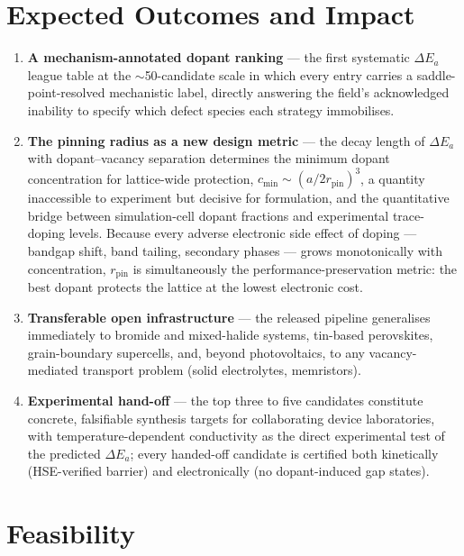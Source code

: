 \documentclass[11pt,a4paper]{article}
\begin{document}
\section{Expected Outcomes and Impact}

\begin{enumerate}[leftmargin=1.6em]
\item \textbf{A mechanism-annotated dopant ranking} --- the first systematic
$\Delta E_a$ league table at the $\sim$50-candidate scale in which every entry carries
a saddle-point-resolved mechanistic label, directly answering the field's acknowledged
inability to specify which defect species each strategy immobilises.

\item \textbf{The pinning radius as a new design metric} --- the decay length of
$\Delta E_a$ with dopant--vacancy separation determines the minimum dopant
concentration for lattice-wide protection,
$c_{\min}\sim (a/2r_{\mathrm{pin}})^{3}$, a quantity inaccessible to experiment but
decisive for formulation, and the quantitative bridge between simulation-cell dopant
fractions and experimental trace-doping levels. Because every adverse electronic side
effect of doping --- bandgap shift, band tailing, secondary phases --- grows
monotonically with concentration, $r_{\mathrm{pin}}$ is simultaneously the
performance-preservation metric: the best dopant protects the lattice at the lowest
electronic cost.

\item \textbf{Transferable open infrastructure} --- the released pipeline generalises
immediately to bromide and mixed-halide systems, tin-based perovskites, grain-boundary
supercells, and, beyond photovoltaics, to any vacancy-mediated transport problem
(solid electrolytes, memristors).

\item \textbf{Experimental hand-off} --- the top three to five candidates constitute
concrete, falsifiable synthesis targets for collaborating device laboratories, with
temperature-dependent conductivity as the direct experimental test of the predicted
$\Delta E_a$; every handed-off candidate is certified both kinetically (HSE-verified
barrier) and electronically (no dopant-induced gap states).
\end{enumerate}

\section{Feasibility}
\end{document}
